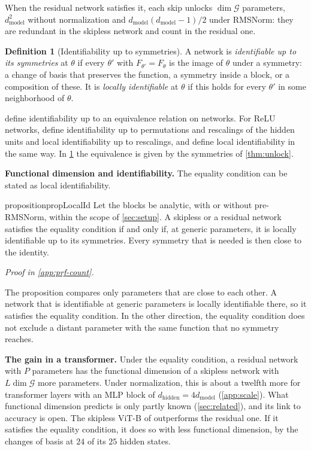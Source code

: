 \documentclass[10pt]{article}
\theoremstyle{definition}
\newtheorem{definition}[theorem]{Definition}
\theoremstyle{remark}
\newcommand{\dm}{d_{\mathrm{model}}}
\newcommand{\dhid}{d_{\mathrm{hidden}}}
\newcommand{\G}{\mathcal{G}}
\newcommand{\para}[1]{\smallskip\noindent\textbf{#1}\hspace{0.5em}}
\newcommand{\proofin}[1]{\par\vspace{-0.4\baselineskip}\noindent\hfill{\small\itshape Proof in \cref{#1}.}\par\smallskip}
\begin{document}
When the residual network satisfies it, each skip unlocks $\dim\G$ parameters, $\dm^2$ without normalization and $\dm(\dm-1)/2$ under RMSNorm: they are redundant in the skipless network and count in the residual one.

\begin{definition}[Identifiability up to symmetries]\label{def:ident}
A network is \emph{identifiable up to its symmetries} at $\theta$ if every $\theta'$ with $F_{\theta'} = F_\theta$ is the image of $\theta$ under a symmetry: a change of basis that preserves the function, a symmetry inside a block, or a composition of these. It is \emph{locally identifiable} at $\theta$ if this holds for every $\theta'$ in some neighborhood of $\theta$.
\end{definition}

\citet{vlacic2020affine} define identifiability up to an equivalence relation on networks. For ReLU networks, \citet{stock2021embedding} define identifiability up to permutations and rescalings of the hidden units and local identifiability up to rescalings, and \citet{bonapellissier2022local} define local identifiability in the same way. In \cref{def:ident} the equivalence is given by the symmetries of \cref{thm:unlock}.

\para{Functional dimension and identifiability.} The equality condition can be stated as local identifiability.

\begin{restatable}{proposition}{propLocalId}\label{prop:localid}
Let the blocks be analytic, with or without pre-RMSNorm, within the scope of \cref{sec:setup}. A skipless or a residual network satisfies the equality condition if and only if, at generic parameters, it is locally identifiable up to its symmetries. Every symmetry that is needed is then close to the identity.
\end{restatable}
\proofin{app:prf-count}

The proposition compares only parameters that are close to each other. A network that is identifiable at generic parameters is locally identifiable there, so it satisfies the equality condition. In the other direction, the equality condition does not exclude a distant parameter with the same function that no symmetry reaches.

\para{The gain in a transformer.} Under the equality condition, a residual network with $P$ parameters has the functional dimension of a skipless network with $L\dim\G$ more parameters. Under normalization, this is about a twelfth more for transformer layers with an MLP block of $\dhid = 4\dm$ (\cref{app:scale}). What functional dimension predicts is only partly known (\cref{sec:related}), and its link to accuracy is open. The skipless ViT-B of \citet{ji2026cutting} outperforms the residual one. If it satisfies the equality condition, it does so with less functional dimension, by the changes of basis at $24$ of its $25$ hidden states.
\end{document}
